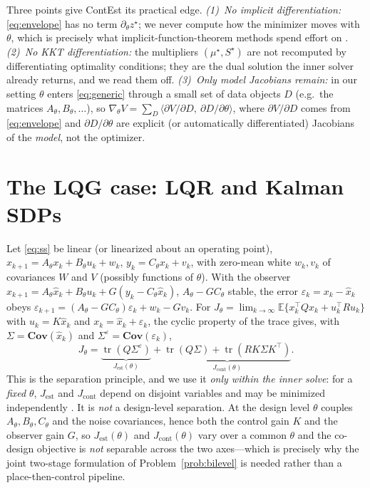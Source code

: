 \documentclass[twocolumn,amsthm]{autart}
\begin{document}
Three points give ContEst its practical edge. \emph{(1)~No implicit
differentiation:} \eqref{eq:envelope} has no term $\partial_\theta z^\star$; we
never compute how the minimizer moves with $\theta$, which is precisely what
implicit-function-theorem methods spend effort on
\cite{amos2017optnet,agrawal2019differentiable}. \emph{(2)~No KKT
differentiation:} the multipliers $(\mu^\star,S^\star)$ are not recomputed by
differentiating optimality conditions; they are the dual solution the inner
solver already returns, and we read them off. \emph{(3)~Only model Jacobians
remain:} in our setting $\theta$ enters \eqref{eq:generic} through a small set of
data objects $D$ (e.g.\ the matrices $A_\theta, B_\theta, \dots$), so
$\nabla_\theta V = \sum_D \langle \partial V / \partial D,\ \partial D /
\partial\theta\rangle$, where $\partial V/\partial D$ comes from
\eqref{eq:envelope} and $\partial D/\partial\theta$ are explicit (or
automatically differentiated) Jacobians of the \emph{model}, not the optimizer.

\section{The LQG case: LQR and Kalman SDPs}\label{sec:lqg}

Let \eqref{eq:ss} be linear (or linearized about an operating point),
$x_{k+1} = A_\theta x_k + B_\theta u_k + w_k$, $y_k = C_\theta x_k + v_k$, with
zero-mean white $w_k, v_k$ of covariances $W$ and $V$ (possibly functions of
$\theta$). With the observer
$\hat x_{k+1} = A_\theta \hat x_k + B_\theta u_k + G(y_k - C_\theta \hat x_k)$,
$A_\theta - G C_\theta$ stable, the error
$\varepsilon_k = x_k - \hat x_k$ obeys
$\varepsilon_{k+1} = (A_\theta - G C_\theta)\varepsilon_k + w_k - G v_k$.
For $J_\theta = \lim_{k\to\infty} \mathbb{E}\{ x_k^\top Q x_k + u_k^\top R u_k\}$
with $u_k = K\hat x_k$ and $x_k = \hat x_k + \varepsilon_k$, the cyclic property
of the trace gives, with $\Sigma = \mathbf{Cov}(\hat x_k)$ and
$\Sigma^\varepsilon = \mathbf{Cov}(\varepsilon_k)$,
\begin{equation}
J_\theta = \underbrace{\operatorname{tr}(Q\Sigma^\varepsilon)}_{J_{\mathrm{est}}(\theta)}
+ \underbrace{\operatorname{tr}(Q\Sigma) + \operatorname{tr}(R K \Sigma K^\top)}_{J_{\mathrm{cont}}(\theta)}.
\end{equation}
This is the separation principle, and we use it \emph{only within the inner
solve}: for a \emph{fixed} $\theta$, $J_{\mathrm{est}}$ and $J_{\mathrm{cont}}$
depend on disjoint variables and may be minimized independently
\cite{tzoumas2021lqg}. It is \emph{not} a design-level separation. At the design
level $\theta$ couples $A_\theta, B_\theta, C_\theta$ and the noise covariances,
hence both the control gain $K$ and the observer gain $G$, so
$J_{\mathrm{est}}(\theta)$ and $J_{\mathrm{cont}}(\theta)$ vary over a common
$\theta$ and the co-design objective is \emph{not} separable across the two
axes---which is precisely why the joint two-stage formulation of
Problem~\ref{prob:bilevel} is needed rather than a place-then-control pipeline.
\end{document}
